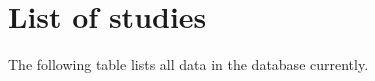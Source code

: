 \section{List of studies}

The following table lists all data in the database currently.

\begin{center}
    \footnotesize
    
\end{center}

